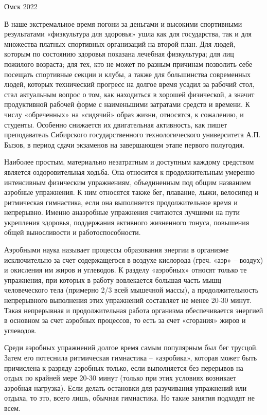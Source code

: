 \documentclass[14pt, a4paper]{article}
\begin{document}
    \vspace*{\fill}
    \begin{center}
        Омск 2022
    \end{center}

    \newpage

    В наше экстремальное время погони за деньгами и высокими спортивными результатами «физкультура для здоровья» ушла как для государства, так и для множества платных спортивных организаций на второй  план. Для людей, которым по состоянию здоровья показана лечебная физкультура; для лиц пожилого возраста; для тех, кто не  может по разным причинам позволить себе посещать спортивные секции и клубы, а также для большинства современных людей, которых технический  прогресс на долгое время усадил за рабочий стол, стал актуальным вопрос о том, как находиться в хорошей физической, а значит продуктивной рабочей форме с наименьшими затратами средств и времени. К числу «обреченных» на «сидячий» образ  жизни, относятся, к сожалению, и студенты. Особенно снижается их двигательная активность, как пишет преподаватель Сибирского государственного технологического университета А.П. Бызов, в период сдачи экзаменов на завершающем этапе первого полугодия.

    Наиболее простым, материально незатратным и доступным каждому средством является оздоровительная ходьба. Она относится к продолжительным умеренно интенсивным физическим упражнениям, объединенным под общим названием аэробные упражнения. К ним относятся также бег, плавание, лыжи, велосипед и ритмическая гимнастика, если она выполняется продолжительное время и непрерывно. Именно анаэробные упражнения считаются лучшими на пути укрепления здоровья, поддержания активного жизненного тонуса, повышения общей выносливости и работоспособности.

    Аэробными наука называет процессы образования энергии в организме исключительно за счет содержащегося в воздухе кислорода (греч. «аэр» – воздух) и окисления им жиров и углеводов. К разделу «аэробных» относят только те упражнения, при которых в работу вовлекается большая  часть мышц человеческого тела (примерно 2/3 всей мышечной массы), а продолжительность непрерывного выполнения этих упражнений составляет  не менее 20-30 минут. Такая непрерывная и продолжительная работа организма обеспечивается энергией в основном за счет аэробных процессов, то есть за счет «сгорания» жиров и углеводов.
    
    Среди аэробных упражнений долгое время самым популярным был бег трусцой. Затем его потеснила ритмическая гимнастика – «аэробика», которая может быть причислена к разряду аэробных только, если выполняется без перерывов на отдых по крайней мере 20-30 минут (только при этих условиях  возникает аэробная нагрузка). Если делать остановки для разучивания упражнений или отдыха, то это, всего лишь, обычная гимнастика.  Но такие занятия подходят не всем.
    
\end{document}
